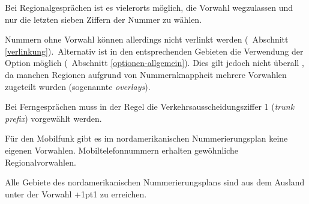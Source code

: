 \documentclass[numbers=noenddot]{scrreprt}
\newcommand{\KeineVerlinkung}{Nummern ohne Vorwahl können allerdings nicht verlinkt werden
\vglAbschnitt{verlinkung}.}
\newcommand*{\vglAbschnitt}[1]{(\cf\ Abschnitt \ref{#1})}
\begin{document}
Bei Regionalgesprächen ist es vielerorts möglich, die Vorwahl wegzulassen und nur die letzten sieben Ziffern der Nummer zu wählen.
\begin{sidebyside}
\end{sidebyside}
\KeineVerlinkung\ Alternativ ist in den entsprechenden Gebieten die Verwendung der Option  möglich
\vglAbschnitt{optionen-allgemein}. Dies gilt jedoch nicht überall \cite{NANPA-ten-digit}, da manchen Regionen aufgrund von Nummernknappheit mehrere Vorwahlen zugeteilt wurden (sogenannte \emph{overlays}).

Bei Ferngesprächen muss in der Regel die Verkehrsausscheidungsziffer 1 (\emph{trunk prefix}) vorgewählt werden.
\begin{sidebyside}
\end{sidebyside}

Für den Mobilfunk gibt es im nordamerikanischen Nummerierungsplan keine eigenen Vorwahlen. Mobiltelefonnummern erhalten gewöhnliche Regionalvorwahlen.

Alle Gebiete des nordamerikanischen Nummerierungsplans sind aus dem Ausland unter der Vorwahl +\kern1pt1 zu erreichen.
\begin{sidebyside}
\end{sidebyside}
\end{document}
